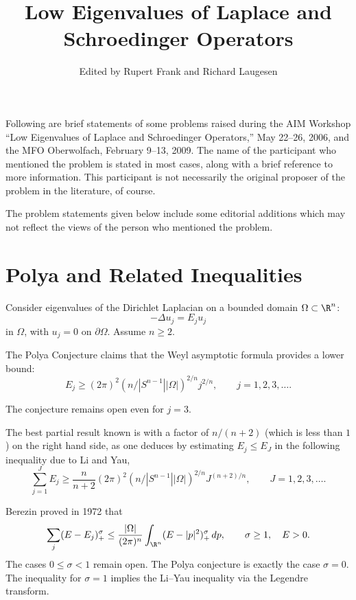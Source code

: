 \documentclass[12pt,letterpaper, reqno]{amsart}
\begin{document}
\title{Low Eigenvalues of Laplace and Schroedinger Operators}
\author{Edited by Rupert Frank and Richard Laugesen}


\maketitle

Following are brief statements of some problems raised during the
AIM Workshop ``Low Eigenvalues of Laplace and Schroedinger
Operators,'' May 22--26, 2006, and the MFO Oberwolfach, February 9--13, 2009. The name of the participant who
mentioned the problem is stated in most cases, along with a brief
reference to more information. This participant is not necessarily
the original proposer of the problem in the literature, of course.

The problem statements given below include some editorial additions
which may not reflect the views of the person who
mentioned the problem.

\section{Polya and Related Inequalities}

Consider eigenvalues of the Dirichlet Laplacian on a bounded domain
$\Omega \subset \R^n$:
\[
-\Delta u_j = E_j u_j
\]
in $\Omega$, with $u_j = 0 $ on $\partial \Omega$.
Assume $n \geq 2$.


\begin{problemblock}

\begin{problem}[1.1] 
The Polya Conjecture claims
that the Weyl asymptotic formula provides a lower bound:
\[
E_j \geq (2\pi)^2 (n/ |S^{n-1}| |\Omega|)^{2/n} j^{2/n} , \qquad j =
1,2,3,\ldots .
\]
\end{problem}
\begin{distinguishedremark}
The conjecture remains open even for $j=3$.
\end{distinguishedremark}


\begin{remark}
The best partial result known is with a factor of $n/(n+2)$ (which
is less than $1$) on the right hand side, as one deduces by
estimating $E_j \leq E_J$ in the following inequality due to Li and Yau,
\[
\sum_{j=1}^J E_j \geq \frac{n}{n+2} (2\pi)^2 (n/ |S^{n-1}|
|\Omega|)^{2/n} J^{(n+2)/n} , \qquad J=1,2,3,\ldots .
\]
\end{remark}

\begin{remark}
Berezin proved in 1972 that
\[
\sum_j (E - E_j)_+^\sigma \leq \frac{|\Omega|}{(2\pi)^n} \int_{\R^n} (E
- |p|^2)_+^\sigma \, dp , \qquad \sigma \geq 1, \quad E>0.
\]
The cases $0 \leq \sigma < 1$ remain open. The Polya conjecture is exactly the case $\sigma=0$.
The inequality for $\sigma=1$ implies the Li--Yau inequality via the Legendre transform.
\end{remark}

\end{problemblock}
\end{document}
